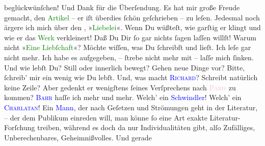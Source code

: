                beglückwünſchen! Und Dank für die Überſendung. Es hat mir große Freude gemacht, den
                  \textcolor{green}{Artikel}{} – er iſt überdies
               ſchön geſchrieben – zu leſen.\pend
           \pstart
           Jedesmal noch ärgere ich mich über den \label{K_L02729-99v}\label{K_L02729-99h}, »\textcolor{green}{Liebelei}{}\ledrightnote{\textcolor{green}{Liebelei. Schauspiel in drei Akten}}«. Wenn Du wüßteſt, wie garſtig er  klingt und wie er das \textcolor{green}{Werk}{} verkleinert! {\pb}Daß Du Dir ſo gar nichts
               ſagen laſſen willſt! Warum nicht »\textcolor{green}{Eine Liebſchaft}{}«?\pend
           \pstart
           Möchte wiſſen, was Du ſchreibſt und lieſt. Ich leſe gar nicht mehr. Ich habe es
               aufgegeben, – ſtrebe nicht mehr mit – laſſe mich ſinken.\pend
           \pstart
           Und wie lebſt Du? Still oder innerlich bewegt? Gehen neue Dinge vor? Bitte, ſchreib’
               mir ein wenig wie Du lebſt.\pend
           \pstart
           Und, was macht \textsc{\textcolor{blue}{Richard}{}\ledrightnote{\textcolor{blue}{Richard Beer-Hofmann}}}? Schreibt natürlich keine Zeile? Aber gedenkt {\pb}er wenigſtens ſeines Verſprechens nach \textsc{\textcolor{pink}{Paris}{}\ledrightnote{\textcolor{pink}{Paris}}} zu kommen?\pend
           \pstart
           \textsc{\textcolor{blue}{Bahr}{}\ledrightnote{\textcolor{blue}{Hermann Bahr}}} haſſe ich mehr und mehr. Welch’ ein \textcolor{blue}{Schwindler}{}! Welch’ ein \textsc{\textcolor{blue}{Charlatan}{}}! Ein \textcolor{blue}{Mann}{}, der nach
               Geſetzen und Strömungen geht in der Literatur, – der dem Publikum einreden will, man
               könne ſo eine Art exakte Literatur-Forſchung treiben, während es doch da nur
               Individualitäten gibt, alſo Zufälliges, Unberechenbares, Geheimnißvolles. Und gerade
